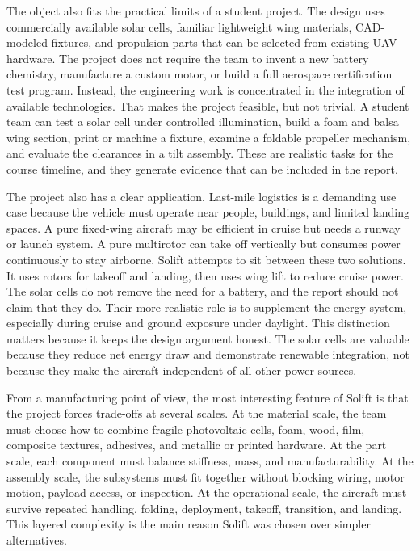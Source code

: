 The object also fits the practical limits of a student project. The design uses commercially available solar cells, familiar lightweight wing materials, CAD-modeled fixtures, and propulsion parts that can be selected from existing UAV hardware. The project does not require the team to invent a new battery chemistry, manufacture a custom motor, or build a full aerospace certification test program. Instead, the engineering work is concentrated in the integration of available technologies. That makes the project feasible, but not trivial. A student team can test a solar cell under controlled illumination, build a foam and balsa wing section, print or machine a fixture, examine a foldable propeller mechanism, and evaluate the clearances in a tilt assembly. These are realistic tasks for the course timeline, and they generate evidence that can be included in the report.

The project also has a clear application. Last-mile logistics is a demanding use case because the vehicle must operate near people, buildings, and limited landing spaces. A pure fixed-wing aircraft may be efficient in cruise but needs a runway or launch system. A pure multirotor can take off vertically but consumes power continuously to stay airborne. Solift attempts to sit between these two solutions. It uses rotors for takeoff and landing, then uses wing lift to reduce cruise power. The solar cells do not remove the need for a battery, and the report should not claim that they do. Their more realistic role is to supplement the energy system, especially during cruise and ground exposure under daylight. This distinction matters because it keeps the design argument honest. The solar cells are valuable because they reduce net energy draw and demonstrate renewable integration, not because they make the aircraft independent of all other power sources.

From a manufacturing point of view, the most interesting feature of Solift is that the project forces trade-offs at several scales. At the material scale, the team must choose how to combine fragile photovoltaic cells, foam, wood, film, composite textures, adhesives, and metallic or printed hardware. At the part scale, each component must balance stiffness, mass, and manufacturability. At the assembly scale, the subsystems must fit together without blocking wiring, motor motion, payload access, or inspection. At the operational scale, the aircraft must survive repeated handling, folding, deployment, takeoff, transition, and landing. This layered complexity is the main reason Solift was chosen over simpler alternatives.

